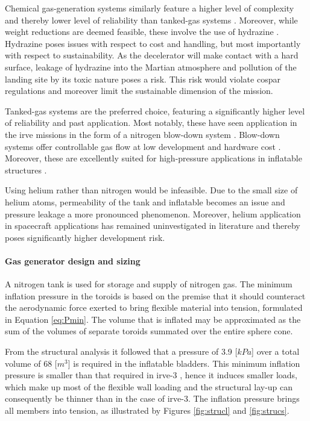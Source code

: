 Chemical gas-generation systems similarly feature a higher level of complexity and thereby lower level of reliability than tanked-gas systems \cite{Jenkins2001}. Moreover, while weight reductions are deemed feasible, these involve the use of hydrazine \cite{Jenkins2001, Freeland1998}. Hydrazine poses issues with respect to cost and handling, but most importantly with respect to sustainability. As the decelerator will make contact with a hard surface, leakage of hydrazine into the Martian atmosphere and pollution of the landing site by its toxic nature poses a risk. This risk would violate \gls{cospar} regulations and moreover limit the sustainable dimension of the mission.

Tanked-gas systems are the preferred choice, featuring a significantly higher level of reliability and past application. Most notably, these have seen application in the \gls{irve} missions in the form of a nitrogen blow-down system \cite{Smith2010}. Blow-down systems offer controllable gas flow at low development and hardware cost \cite{Freeland1998}. Moreover, these are excellently suited for high-pressure applications in inflatable structures \cite{Jenkins2001}.

Using helium rather than nitrogen would be infeasible. Due to the small size of helium atoms, permeability of the tank and inflatable becomes an issue and pressure leakage a more pronounced phenomenon. Moreover, helium application in spacecraft applications has remained uninvestigated in literature and thereby poses significantly higher development risk.


\paragraph{Gas generator design and sizing}
A nitrogen tank is used for storage and supply of nitrogen gas. The minimum inflation pressure in the toroids is based on the premise that it should counteract the aerodynamic force exerted to bring flexible material into tension, formulated in Equation \ref{eq:Pmin}. The volume that is inflated may be approximated as the sum of the volumes of separate toroids summated over the entire sphere cone.

From the structural analysis it followed that a pressure of 3.9 [$kPa$] over a total volume of 68 [$m^{3}$] is required in the inflatable bladders. This minimum inflation pressure is smaller than that required in \gls{irve}-3 \cite{Jurewicz2011}, hence it induces smaller loads, which make up most of the flexible wall loading and the structural lay-up can consequently be thinner than in the case of \gls{irve}-3. The inflation pressure brings all members into tension, as illustrated by Figures \ref{fig:strucl} and \ref{fig:strucs}.

